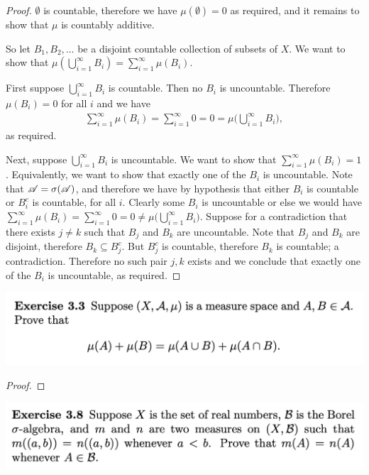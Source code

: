 \begin{proof}
  $\emptyset$ is countable, therefore we have $\mu(\emptyset) = 0$ as required, and it remains to show
  that $\mu$ is countably additive.

  So let $B_1, B_2, \dots$ be a disjoint countable collection of subsets of $X$. We want to show
  that $\mu(\bigcup_{i=1}^\infty B_i) = \sum_{i=1}^\infty \mu(B_i)$.


  First suppose $\bigcup_{i=1}^\infty B_i$ is countable. Then no $B_i$ is uncountable. Therefore $\mu(B_i) = 0$
  for all $i$ and we have
  \begin{align*}
    \sum_{i=1}^\infty \mu(B_i) = \sum_{i=1}^\infty 0 = 0 = \mu\big(\bigcup_{i=1}^\infty B_i\big),
  \end{align*}
  as required.

  Next, suppose $\bigcup_{i=1}^\infty B_i$ is uncountable. We want to show
  that $\sum_{i=1}^\infty \mu(B_i) = 1$. Equivalently, we want to show that exactly one of the $B_i$ is
  uncountable. Note that $\mathscr A = \sigma(\mathscr A)$, and therefore we have by hypothesis that either $B_i$ is
  countable or $B_i^c$ is countable, for all $i$. Clearly some $B_i$ is uncountable or else we would
  have $\sum_{i=1}^\infty \mu(B_i) = \sum_{i=1}^\infty 0 = 0 \neq \mu\big(\bigcup_{i=1}^\infty B_i\big)$.
  Suppose for a contradiction that there exists $j \neq k$ such that $B_j$ and $B_k$ are uncountable. Note
  that $B_j$ and $B_k$ are disjoint, therefore $B_k \subseteq B_j^c$. But $B_j^c$ is countable, therefore $B_k$
  is countable; a contradiction. Therefore no such pair $j, k$ exists and we conclude that exactly one of
  the $B_i$ is uncountable, as required.
\end{proof}
\newpage
\begin{mdframed}
\includegraphics[width=400pt]{img/analysis--berkeley-202a-hw-2389.png}
\end{mdframed}

\begin{proof}

\end{proof}
\newpage
\begin{mdframed}
\includegraphics[width=400pt]{img/analysis--berkeley-202a-hw-3a79.png}
\end{mdframed}

